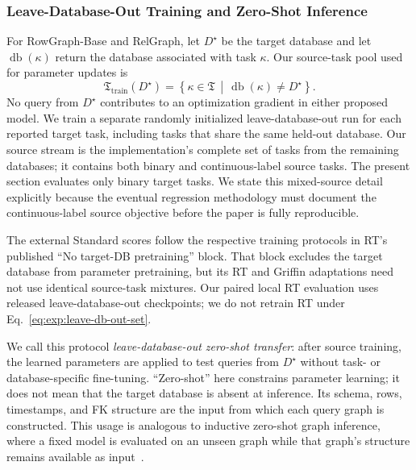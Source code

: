 \subsubsection{Leave-Database-Out Training and Zero-Shot Inference}
\label{sec:exp:zero-shot-protocol}

For RowGraph-Base and RelGraph, let \(D^\star\) be the target database and
let \(\operatorname{db}(\kappa)\) return the database associated with task
\(\kappa\). Our source-task pool used for parameter updates is
\begin{equation}
  \mathfrak T_{\mathrm{train}}(D^\star)
  =
  \left\{
    \kappa\in\mathfrak T
    \,\middle|\,
    \operatorname{db}(\kappa)\neq D^\star
  \right\}.
\label{eq:exp:leave-db-out-set}
\end{equation}
No query from \(D^\star\) contributes to an optimization gradient in either
proposed model. We train a separate randomly initialized leave-database-out
run for each reported target task, including tasks that share the same
held-out database. Our source stream is the implementation's complete set
of tasks from the remaining databases; it contains both binary and
continuous-label source tasks. The present section evaluates only binary
target tasks. We state this mixed-source detail explicitly because the
eventual regression methodology must document the continuous-label source
objective before the paper is fully reproducible.

The external Standard scores follow the respective training protocols in
RT's published ``No target-DB pretraining'' block. That block excludes the
target database from parameter pretraining, but its RT and Griffin
adaptations need not use identical source-task mixtures. Our paired local RT
evaluation uses released leave-database-out checkpoints; we do not retrain
RT under Eq.~\eqref{eq:exp:leave-db-out-set}.

We call this protocol \emph{leave-database-out zero-shot transfer}: after
source training, the learned parameters are applied to test queries from
\(D^\star\) without task- or database-specific fine-tuning. ``Zero-shot''
here constrains parameter learning; it does not mean that the target
database is absent at inference. Its schema, rows, timestamps, and FK
structure are the input from which each query graph is constructed. This
usage is analogous to inductive zero-shot graph inference, where a fixed
model is evaluated on an unseen graph while that graph's structure remains
available as input~\citep{galkin2024ultra}.

